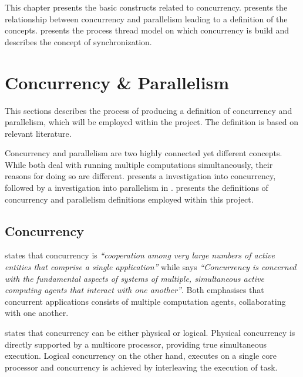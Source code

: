 \makeatletter {}\makeatother
{}
This chapter presents the basic constructs related to concurrency.  presents the relationship between concurrency and parallelism leading to a definition of the concepts.  presents the process thread model on which concurrency is build and  describes the concept of synchronization.
\section{Concurrency \& Parallelism}\label{sec:concurrency_parallelism}
This sections describes the process of producing a definition of concurrency and parallelism, which will be employed within the project. The definition is based on relevant literature.

Concurrency and parallelism are two highly connected yet different concepts. While both deal with running multiple computations simultaneously, their reasons for doing so are different.  presents a investigation into concurrency, followed by a investigation into parallelism in 
.  presents the definitions of concurrency and parallelism definitions employed within this project.

\subsection{Concurrency}\label{sec:basics_concurrency}
\cite[p. 330]{papadopoulos1998coordination} states that concurrency is \textit{``cooperation among very large numbers of active entities that comprise a single application''} while \cite[p. 607]{cleaveland1996strategic}
says \textit{``Concurrency is concerned with the fundamental aspects of systems of multiple, simultaneous active computing agents that interact with one another''}. Both emphasises that concurrent applications consists of multiple computation agents, collaborating with one another.

\cite[p. 579]{sebestaProLang} states that concurrency can be either physical or logical. Physical concurrency is directly supported by a multicore processor, providing true simultaneous execution. Logical concurrency on the other hand, executes on a single core processor and concurrency is achieved by interleaving the execution of task.

